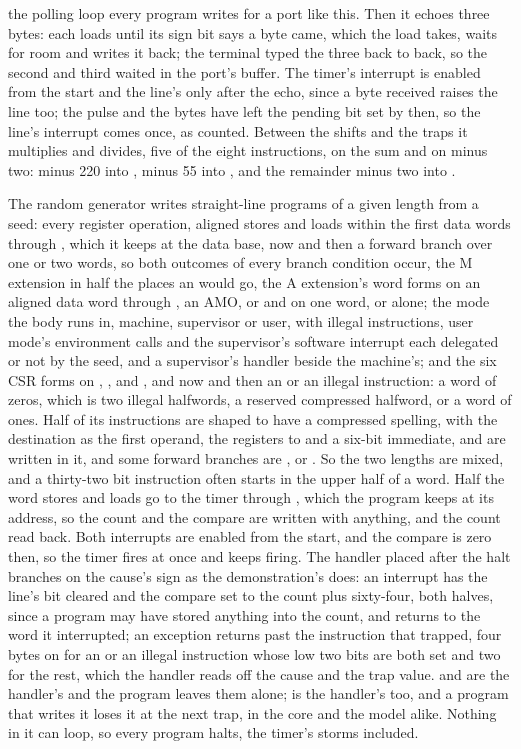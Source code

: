\documentclass[journal,onecolumn,9pt]{IEEEtran}
\begin{document}
the polling loop every program writes for a port like this. Then it
echoes three bytes: each loads  until its sign bit says a
byte came, which the load takes, waits for room and writes it back; the
terminal typed the three back to back, so the second and third
waited in the port's buffer. The
timer's interrupt is enabled from the start and the line's only
after the echo, since a byte received raises the line too; the
pulse and the bytes have left the pending bit set by then, so the
line's interrupt comes once, as counted. Between the shifts
and the traps it multiplies and divides, five of the eight
instructions, on the sum and on minus two: minus 220 into
, minus 55 into , and the remainder minus two
into .

The random generator writes straight-line programs of a given length
from a seed: every register operation, aligned stores and loads
within the first data words through , which it keeps at the
data base, now and then a forward branch over one or two words, so
both outcomes of every branch condition occur, the M extension in
half the places an  would go, the A extension's word forms
on an aligned data word through , an AMO, or 
and  on one word, or  alone; the mode the
body runs in, machine, supervisor or user, with illegal instructions,
user mode's environment calls and the supervisor's software interrupt
each delegated or not by the seed, and a supervisor's handler beside
the machine's; and the six CSR forms on
, ,  and ,
and now and then an  or an illegal instruction: a word of
zeros, which is two illegal halfwords, a reserved compressed halfword,
or a word of ones. Half of its instructions are shaped to have a
compressed spelling, with the destination as the first operand, the
registers  to  and a six-bit immediate, and are
written in it, and some forward branches are ,
 or . So the two lengths are mixed, and a
thirty-two bit instruction often starts in the upper half of a word.
Half the word stores and loads go to the timer through
, which the program keeps at its address, so the count
and the compare are written with anything, and the count read
back. Both interrupts are enabled from the start, and the compare is
zero then, so the timer fires at once and keeps firing. The handler
placed after the halt branches on the cause's sign as the
demonstration's does: an interrupt has the line's bit cleared and
the compare set to the count plus sixty-four, both halves, since a
program may have stored anything into the count, and returns to the
word it interrupted; an exception returns past the instruction that
trapped, four bytes on for an  or an illegal instruction
whose low two bits are both set and two for the rest, which the
handler reads off the cause and the trap value.  and
 are the handler's and the program leaves them alone;
 is the handler's too, and a program that writes it loses
it at the next trap, in the core and the model alike. Nothing in it can loop, so every program halts, the
timer's storms included.
\end{document}
